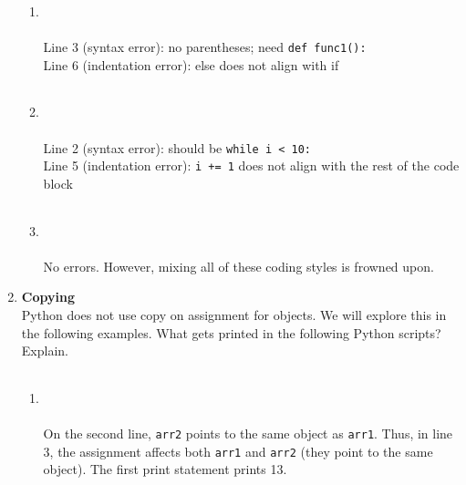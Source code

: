 \documentclass{article}
\newcounter{points}
\begin{document}
\begin{enumerate}
\begin{enumerate}
\item
\lstset{numbers=left}
\begin{tabular}{c}

\end{tabular} \\ \\
Line 3 (syntax error): no parentheses; need \texttt{def func1():} \\
Line 6 (indentation error): else does not align with if
\end{enumerate}

\begin{enumerate}
\setcounter{enumii}{1}
\item
\lstset{numbers=left}
\begin{tabular}{c}

\end{tabular} \\ \\
Line 2 (syntax error): should be \texttt{while i < 10:} \\
Line 5 (indentation error): \texttt{i += 1} does not align with the rest of the code block
\end{enumerate}

\begin{enumerate}
\setcounter{enumii}{2}
\item
\lstset{numbers=left}
\begin{tabular}{c}

\end{tabular} \\ \\
No errors.  However, mixing all of these coding styles is frowned upon.
\end{enumerate}

\newpage
\item \textbf{Copying} \\
Python does not use copy on assignment for objects.  We will explore this in the following examples.  What gets printed in the following Python scripts?  Explain.

\begin{enumerate}
\item
\begin{tabular}{c}

\end{tabular} \\ \\
On the second line, \texttt{arr2} points to the same object as \texttt{arr1}.  Thus, in line 3, the assignment affects both \texttt{arr1} and \texttt{arr2} (they point to the same object).  The first print statement prints 13. \\


\end{enumerate}
\end{enumerate}
\end{document}
